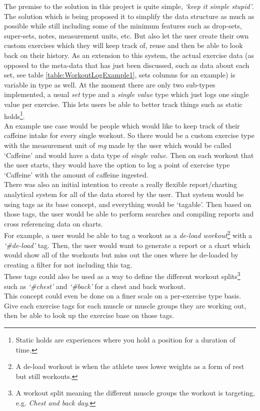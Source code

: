 \documentclass{article}
\begin{document}
\begin{multicols}{2}
The premise to the solution in this project is quite simple, \textit{`keep it simple stupid'}. The solution which is being proposed it to simplify the data structure as much as possible while still including some of the minimum features such as drop-sets, super-sets, notes, measurement units, etc. But also let the user create their own custom exercises which they will keep track of, reuse and then be able to look back on their history. As an extension to this system, the actual exercise data (as opposed to the meta-data that has just been discussed, such as data about each set, see table \ref{table:WorkoutLogExample1}, sets columns for an example) is variable in type as well. At the moment there are only two sub-types implemented, a usual \textit{set} type and a \textit{single value} type which just logs one single value per exercise. This lets users be able to better track things such as static holds\footnote{Static holds are experiences where you hold a position for a duration of time.}.\\
An example use case would be people which would like to keep track of their caffeine intake for every single workout. So there would be a custom exercise type with the measurement unit of \textit{mg} made by the user which would be called  `Caffeine' and would have a data type of \textit{single value}. Then on each workout that the user starts, they would have the option to log a point of exercise type `Caffeine' with the amount of caffeine ingested.\\
There was also an initial intention to create a really flexible report/charting analytical system for all of the data stored by the user. That system would be using tags as its base concept, and everything would be `tagable'. Then based on those tags, the user would be able to perform searches and compiling reports and cross referencing data on charts.\\
For example, a user would be able to tag a workout as a \textit{de-load workout}\footnote{A de-load workout is when the athlete uses lower weights as a form of rest but still workouts.} with a \textit{`\#de-load'} tag. Then, the user would want to generate a report or a chart which would show all of the workouts but miss out the ones where he de-loaded by creating a filter for not including this tag.\\
These tags could also be used as a way to define the different workout splits\footnote{A workout split meaning the different muscle groups the workout is targeting, e.g. \textit{Chest and back day}.} such as \textit{`\#chest'} and \textit{`\#back'} for a chest and back workout.\\
This concept could even be done on a finer scale on a per-exercise type basis. Give each exercise tags for each muscle or muscle groups they are working out, then be able to look up the exercise base on those tags.\\


\end{multicols}
\end{document}
